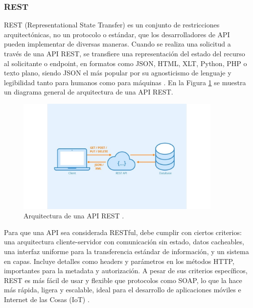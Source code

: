 \subsubsection{REST}
REST (Representational State Transfer) es un conjunto de restricciones
arquitectónicas, no un protocolo o estándar, que los desarrolladores de API
pueden implementar de diversas maneras. Cuando se realiza una solicitud a
través de una API REST, se transfiere una representación del estado del
recurso al solicitante o endpoint, en formatos como JSON, HTML, XLT, Python,
PHP o texto plano, siendo JSON el más popular por su agnosticismo de lenguaje
y legibilidad tanto para humanos como para máquinas \cite{Red_Hat_REST_API}. En
la Figura \ref{fig:rest-api} se muestra un diagrama general de arquitectura
de una API REST.

\begin{figure}[!htbp]
  \centering
  \includegraphics[width=0.9\textwidth]{imagenes/02-marco-teorico/rest-api-diagram.jpg}
  \caption[Arquitectura de una API REST]{Arquitectura de una API REST \cite{restapi_ironio}.}
  \label{fig:rest-api}
\end{figure}

Para que una API sea considerada RESTful, debe cumplir con ciertos criterios:
una arquitectura cliente-servidor con comunicación sin estado, datos cacheables,
una interfaz uniforme para la transferencia estándar de información, y un sistema
en capas. Incluye detalles como headers y parámetros en los métodos HTTP,
importantes para la metadata y autorización. A pesar de sus criterios específicos,
REST es más fácil de usar y flexible que protocolos como SOAP, lo que la hace
más rápida, ligera y escalable, ideal para el desarrollo de aplicaciones móviles
e Internet de las Cosas (IoT) \cite{Red_Hat_REST_API}.

